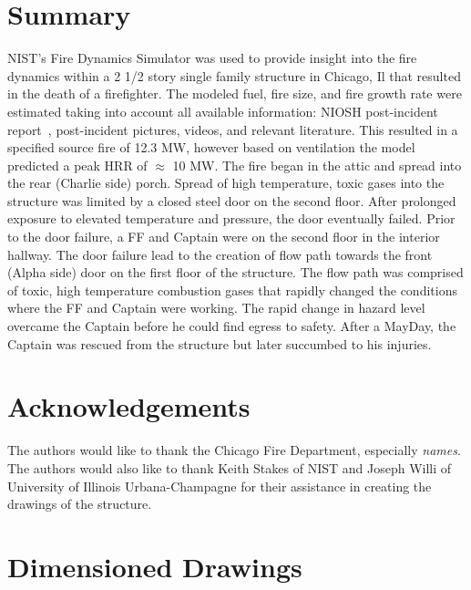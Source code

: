 \documentclass[11pt,oneside]{book}
\begin{document}
\chapter{Summary}
NIST's Fire Dynamics Simulator was used to provide insight into the fire dynamics within a 2 1/2 story single family structure in Chicago, Il that resulted in the death of a firefighter. The modeled fuel, fire size, and fire growth rate were estimated taking into account all available information: NIOSH post-incident report~\cite{NIOSH:Bowyer}, post-incident pictures, videos, and relevant literature. This resulted in a specified source fire of 12.3 MW, however based on ventilation the model predicted a peak HRR of $\approx$ 10 MW. The fire began in the attic and spread into the rear (Charlie side) porch. Spread of high temperature, toxic gases into the structure was limited by a closed steel door on the second floor. After prolonged exposure to elevated temperature and pressure, the door eventually failed. Prior to the door failure, a FF and Captain were on the second floor in the interior hallway. The door failure lead to the creation of flow path towards the front (Alpha side) door on the first floor of the structure. The flow path was comprised of toxic, high temperature combustion gases that rapidly changed the conditions where the FF and Captain were working. The rapid change in hazard level overcame the Captain before he could find egress to safety. After a MayDay, the Captain was rescued from the structure but later succumbed to his injuries. 



\chapter{Acknowledgements}
The authors would like to thank the Chicago Fire Department, especially {\em names}. The authors would also like to thank Keith Stakes of NIST and Joseph Willi of University of Illinois Urbana-Champagne for their assistance in creating the drawings of the structure.




\appendix

\chapter{Dimensioned Drawings}
\end{document}
